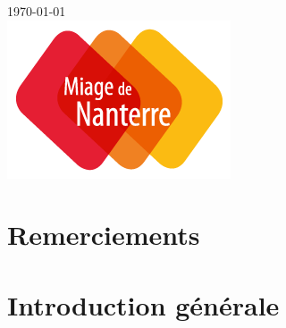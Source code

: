 \documentclass[12pt]{article}
\begin{document}
\begin{titlepage}


{\large \today}\\[2cm] %


\includegraphics[draft=false, scale=0.5]{imgs/miage-nanterre.png}\\[1cm] %
 

\vfill %

\end{titlepage}

\clearpage

\renewcommand*\contentsname{Sommaire}

\clearpage

\tableofcontents

\clearpage

\section{Remerciements}


\clearpage

\section{Introduction générale}
\end{document}
